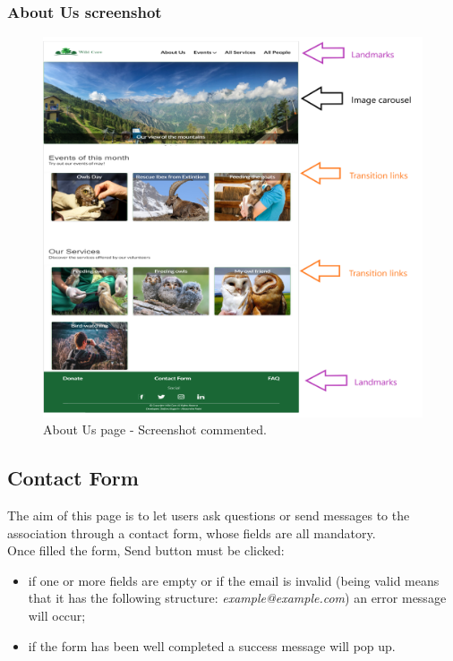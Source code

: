 \subsubsection{About Us screenshot}
\begin{figure}[h!]
	\centering
	\begin{minipage}[b]{1\textwidth}
    		\includegraphics[width=\textwidth]{./assets/mockups/homepage_commented.png}
		\caption{About Us page - Screenshot commented.}
	\end{minipage}
\end{figure}
\FloatBarrier

\clearpage


\subsection{Contact Form}
The aim of this page is to let users ask questions or send messages to the association through a contact form, whose fields are all mandatory. \\
Once filled the form, Send button must be clicked:
\begin{itemize}
	\item if one or more fields are empty or if the email is invalid (being valid means that it has the following structure: 				\emph{example@example.com}) an error message will occur;
	\item if the form has been well completed a success message will pop up.
\end{itemize}

